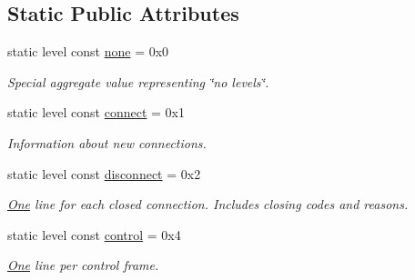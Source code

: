 \subsection*{Static Public Attributes}
\begin{DoxyCompactItemize}
\item 
\mbox{\label{structwebsocketpp_1_1log_1_1alevel_a4cf0520816094999975fe73081cf30f2}} 
static level const \mbox{\hyperlink{structwebsocketpp_1_1log_1_1alevel_a4cf0520816094999975fe73081cf30f2}{none}} = 0x0
\begin{DoxyCompactList}\small\item\em Special aggregate value representing \char`\"{}no levels\char`\"{}. \end{DoxyCompactList}\item 
static level const \mbox{\hyperlink{structwebsocketpp_1_1log_1_1alevel_aac3e16b6df297567ba2533233d477d57}{connect}} = 0x1
\begin{DoxyCompactList}\small\item\em Information about new connections. \end{DoxyCompactList}\item 
\mbox{\label{structwebsocketpp_1_1log_1_1alevel_af19681d3edb28e0407688eeda8f0005c}} 
static level const \mbox{\hyperlink{structwebsocketpp_1_1log_1_1alevel_af19681d3edb28e0407688eeda8f0005c}{disconnect}} = 0x2
\begin{DoxyCompactList}\small\item\em \mbox{\hyperlink{struct_one}{One}} line for each closed connection. Includes closing codes and reasons. \end{DoxyCompactList}\item 
\mbox{\label{structwebsocketpp_1_1log_1_1alevel_ae67e6466bf3d9daf45cc865e8d48f445}} 
static level const \mbox{\hyperlink{structwebsocketpp_1_1log_1_1alevel_ae67e6466bf3d9daf45cc865e8d48f445}{control}} = 0x4
\begin{DoxyCompactList}\small\item\em \mbox{\hyperlink{struct_one}{One}} line per control frame. \end{DoxyCompactList}\item 
\mbox{\label{structwebsocketpp_1_1log_1_1alevel_ac25fc7cb5fc229abb6fc893f16ffb678}} 

\end{DoxyCompactItemize}
